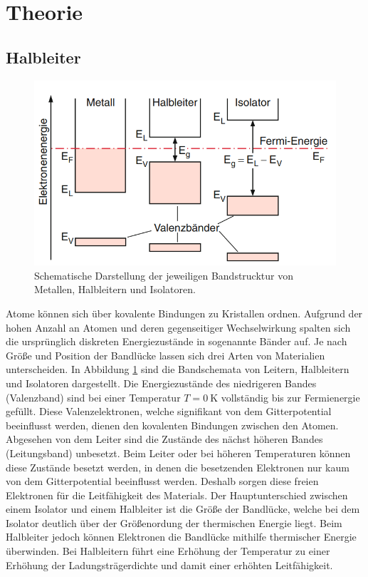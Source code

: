 \section{Theorie}
\label{sec:Theorie}


\subsection{Halbleiter}

\begin{figure}
    \centering
    \includegraphics[width=.9\textwidth]{Bilder/Metall_Iso_Halb.PNG}
    \caption{Schematische Darstellung der jeweiligen Bandstrucktur von Metallen, Halbleitern und Isolatoren.}
    \label{fig:band}
\end{figure}


Atome können sich über kovalente Bindungen zu Kristallen ordnen.
Aufgrund der hohen Anzahl an Atomen und deren gegenseitiger Wechselwirkung spalten sich die ursprünglich diskreten Energiezustände in sogenannte Bänder auf.
Je nach Größe und Position der Bandlücke lassen sich drei Arten von Materialien unterscheiden.
In Abbildung \ref{fig:band} sind die Bandschemata von Leitern, Halbleitern und Isolatoren dargestellt.
Die Energiezustände des niedrigeren Bandes (Valenzband) sind bei einer Temperatur $T=\SI{0}{\kelvin}$ vollständig bis zur Fermienergie gefüllt.
Diese Valenzelektronen, welche signifikant von dem Gitterpotential beeinflusst werden, dienen den kovalenten Bindungen zwischen den Atomen. 
Abgesehen von dem Leiter sind die Zustände des nächst höheren Bandes (Leitungsband) unbesetzt. 
Beim Leiter oder bei höheren Temperaturen können diese Zustände besetzt werden, in denen die besetzenden Elektronen nur kaum von dem Gitterpotential beeinflusst werden.
Deshalb sorgen diese freien Elektronen für die Leitfähigkeit des Materials. 
Der Hauptunterschied zwischen einem Isolator und einem Halbleiter ist die Größe der Bandlücke, welche bei dem Isolator deutlich über der Größenordung der thermischen Energie liegt.
Beim Halbleiter jedoch können Elektronen die Bandlücke mithilfe thermischer Energie überwinden.
Bei Halbleitern führt eine Erhöhung der Temperatur zu einer Erhöhung der Ladungsträgerdichte und damit einer erhöhten Leitfähigkeit.



